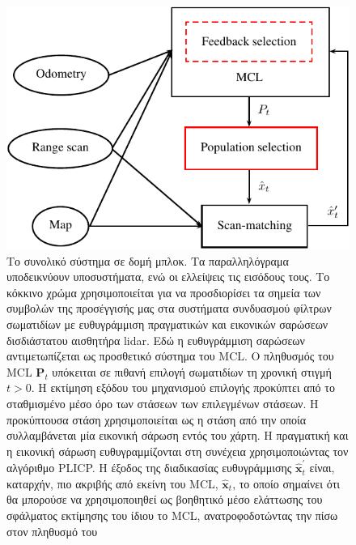 \begin{figure}[ht]\centering
  \includegraphics[scale=0.9]{./figures/parts/02/chapters/02/sections/03/overall_system}
  \caption{\small Το συνολικό σύστημα σε δομή μπλοκ. Τα παραλληλόγραμα
           υποδεικνύουν υποσυστήματα, ενώ οι ελλείψεις τις εισόδους τους. Το
           κόκκινο χρώμα χρησιμοποιείται για να προσδιορίσει τα σημεία των
           συμβολών της προσέγγισής μας στα συστήματα συνδυασμού φίλτρων
           σωματιδίων με ευθυγράμμιση πραγματικών και εικονικών σαρώσεων
           δισδιάστατου αισθητήρα lidar. Εδώ η ευθυγράμμιση σαρώσεων
           αντιμετωπίζεται ως προσθετικό σύστημα του MCL. Ο πληθυσμός του MCL
           $\bm{P}_t$ υπόκειται σε πιθανή επιλογή σωματιδίων τη χρονική στιγμή
           $t>0$. Η εκτίμηση εξόδου του μηχανισμού επιλογής προκύπτει από το
           σταθμισμένο μέσο όρο των στάσεων των επιλεγμένων στάσεων. Η
           προκύπτουσα στάση χρησιμοποιείται ως η στάση από την οποία
           συλλαμβάνεται μία εικονική σάρωση εντός του χάρτη. Η πραγματική και
           η εικονική σάρωση ευθυγραμμίζονται στη συνέχεια χρησιμοποιώντας τον
           αλγόριθμο PLICP. Η έξοδος της διαδικασίας ευθυγράμμισης
           $\hat{\bm{x}}^{\prime}_t$ είναι, καταρχήν, πιο ακριβής από εκείνη
           του MCL, $\hat{\bm{x}}_t$, το οποίο σημαίνει ότι θα μπορούσε να
           χρησιμοποιηθεί ως βοηθητικό μέσο ελάττωσης του σφάλματος εκτίμησης
           του ίδιου το MCL, ανατροφοδοτώντας την πίσω στον πληθυσμό του}
  \label{fig:overall_system}
\end{figure}

